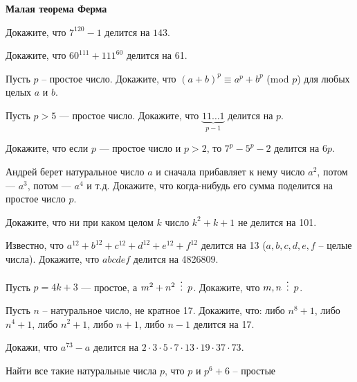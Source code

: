 \documentclass{article}
\begin{document}
    \large

    \begin{center}
        \textbf{Малая теорема Ферма}
    \end{center}

    \begin{enumerate_boxed}

        \item Докажите, что $7^{120} - 1$  делится на $143$.

        \item Докажите, что $60^{111}+111^{60}$ делится на 61.

        \item Пусть $p$ – простое число.
        Докажите, что  $(a + b)^p \equiv a^p + b^p$ (mod $p$) для любых целых $a$ и $b$.

        \item Пусть $p>5$ --- простое число.
        Докажите, что $\underbrace{11\dots 1}_{p-1}$ делится на $p$.

        \item Докажите, что если $p$ --- простое число и $p > 2$, то $7^p - 5^p - 2$ делится на $6p$.

        \item Андрей берет натуральное число $a$ и сначала прибавляет к нему число $a^2$, потом --- $a^3$, потом --- $a^4$ и т.д. Докажите, что когда-нибудь его сумма поделится на простое число $p$.

        \item Докажите, что ни при каком целом $k$ число $k^2 + k + 1$  не делится на 101.

        \item Известно, что  $a^{12} + b^{12} + c^{12} + d^{12} + e^{12} + f^{12}$  делится на 13 ($a, b, c, d, e, f$ – целые числа).
        Докажите, что $abcdef$ делится на 4826809.

        \item Пусть $p = 4k+3$ --- простое, а $m^2 + n^2 \,\,\,\vdots\,\,\, p$.
        Докажите, что $m,n \,\,\,\vdots\,\,\, p$.

        \item Пусть $n$ – натуральное число, не кратное 17.
        Докажите, что: либо $n^8 + 1$, либо $n^4 + 1$, либо $n^2 + 1$, либо $n + 1$, либо $n - 1$ делится на 17.

        \item Докажи, что $a^{73} - a$ делится на $2\cdot3\cdot5\cdot7\cdot13\cdot19\cdot37\cdot73$.

        \item Найти все такие натуральные числа $p$, что $p$ и $p^6 + 6$ – простые


\end{enumerate_boxed}
\end{document}
